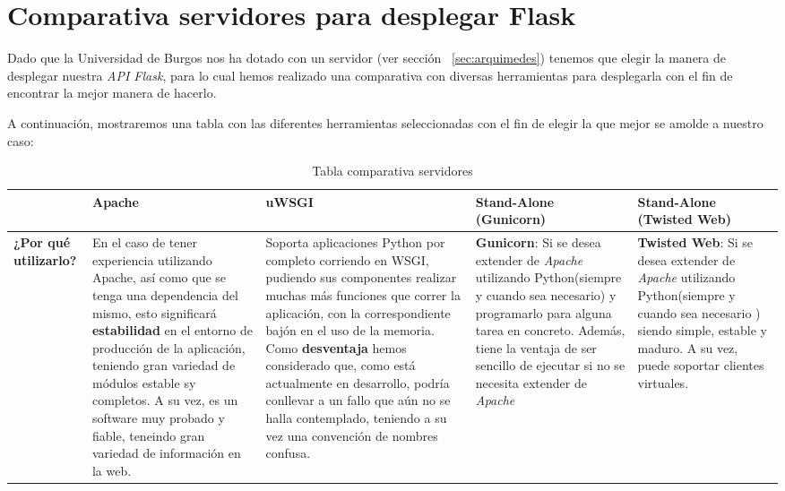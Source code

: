 \section{Comparativa servidores para desplegar Flask}\label{sec:comparativa-servidores}
Dado que la Universidad de Burgos nos ha dotado con un servidor (ver sección ~\ref{sec:arquimedes}) tenemos que elegir la manera de desplegar nuestra \textit{API Flask}, para lo cual hemos realizado una comparativa con diversas herramientas para desplegarla con el fin de encontrar la mejor manera de hacerlo.

A continuación, mostraremos una tabla con las diferentes herramientas seleccionadas con el fin de elegir la que mejor se amolde a nuestro caso:

\begin{landscape}
	\begin{table}
		\centering
		\caption{Tabla comparativa servidores}
		\label{serverTable}
		\begin{tabular}{p{2.0cm} p{3.0cm} p{3.0cm} p{3.0cm} p{3.0cm}}
			\toprule
			  & \textbf{Apache} & \textbf{uWSGI} & \textbf{Stand-Alone (Gunicorn)} & \textbf{Stand-Alone (Twisted Web)} \\
			\midrule
			\textbf{¿Por qué utilizarlo?} & En el caso de tener experiencia utilizando Apache, así como que se tenga una dependencia del mismo, esto significará \textbf{estabilidad} en el entorno de producción de la aplicación, teniendo gran variedad de módulos estable sy completos. A su vez, es un software muy probado y fiable, teneindo gran variedad de información en la web. & Soporta aplicaciones Python por completo corriendo en WSGI, pudiendo sus componentes realizar muchas más funciones que correr la aplicación, con la correspondiente bajón en el uso de la memoria. Como \textbf{desventaja} hemos considerado que, como está actualmente en desarrollo, podría conllevar a un fallo que aún no se halla contemplado, teniendo a su vez una convención de nombres confusa. & \textbf{Gunicorn}: Si se desea extender de \textit{Apache} utilizando Python(siempre y cuando sea necesario) y programarlo para alguna tarea en concreto. Además, tiene la ventaja de ser sencillo de ejecutar si no se necesita extender de \textit{Apache} & \textbf{Twisted Web}: Si se desea extender de \textit{Apache} utilizando Python(siempre y cuando sea necesario ) siendo simple, estable y maduro. A su vez, puede soportar clientes virtuales.\\
			\bottomrule
		\end{tabular}
	\end{table}
\end{landscape}

